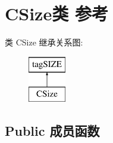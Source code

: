 \hypertarget{class_c_size}{}\section{C\+Size类 参考}
\label{class_c_size}
类 C\+Size 继承关系图\+:\begin{figure}[H]
\begin{center}
\leavevmode
\includegraphics[height=2.000000cm]{class_c_size}
\end{center}
\end{figure}
\subsection*{Public 成员函数}
